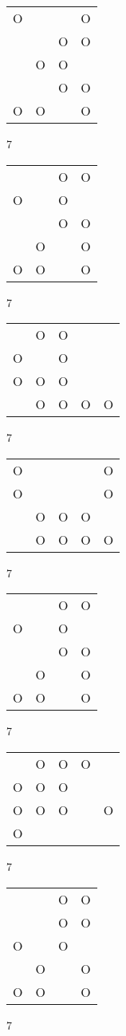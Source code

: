 \begin{tabular}{|m{0.2cm}m{0.2cm}m{0.2cm}m{0.2cm}|}\hline
O& & &O\\
 & &O&O\\
 &O&O& \\
 & &O&O\\
O&O& &O\\
\hline\end{tabular}7
\begin{tabular}{|m{0.2cm}m{0.2cm}m{0.2cm}m{0.2cm}|}\hline
 & &O&O\\
O& &O& \\
 & &O&O\\
 &O& &O\\
O&O& &O\\
\hline\end{tabular}7
\begin{tabular}{|m{0.2cm}m{0.2cm}m{0.2cm}m{0.2cm}m{0.2cm}|}\hline
 &O&O& & \\
O& &O& & \\
O&O&O& & \\
 &O&O&O&O\\
\hline\end{tabular}7
\begin{tabular}{|m{0.2cm}m{0.2cm}m{0.2cm}m{0.2cm}m{0.2cm}|}\hline
O& & & &O\\
O& & & &O\\
 &O&O&O& \\
 &O&O&O&O\\
\hline\end{tabular}7
\begin{tabular}{|m{0.2cm}m{0.2cm}m{0.2cm}m{0.2cm}|}\hline
 & &O&O\\
O& &O& \\
 & &O&O\\
 &O& &O\\
O&O& &O\\
\hline\end{tabular}7
\begin{tabular}{|m{0.2cm}m{0.2cm}m{0.2cm}m{0.2cm}m{0.2cm}|}\hline
 &O&O&O& \\
O&O&O& & \\
O&O&O& &O\\
O& & & & \\
\hline\end{tabular}7
\begin{tabular}{|m{0.2cm}m{0.2cm}m{0.2cm}m{0.2cm}|}\hline
 & &O&O\\
 & &O&O\\
O& &O& \\
 &O& &O\\
O&O& &O\\
\hline\end{tabular}7
